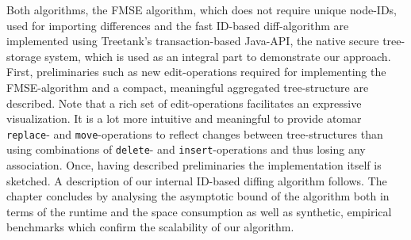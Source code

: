 
Both algorithms, the FMSE algorithm, which does not require unique node-IDs, used for importing differences and the fast ID-based diff-algorithm are implemented using Treetank's transaction-based Java-API, the native secure tree-storage system, which is used as an integral part to demonstrate our approach. First, preliminaries such as new edit-operations required for implementing the FMSE-algorithm and a compact, meaningful aggregated tree-structure are described. Note that a rich set of edit-operations facilitates an expressive visualization. It is a lot more intuitive and meaningful to provide atomar \texttt{replace}- and \texttt{move}-operations to reflect changes between tree-structures than using combinations of \texttt{delete}- and \texttt{insert}-operations and thus losing any association. Once, having described preliminaries the implementation itself is sketched. A description of our internal ID-based diffing algorithm follows. The chapter concludes by analysing the asymptotic bound of the algorithm both in terms of the runtime and the space consumption as well as synthetic, empirical benchmarks which confirm the scalability of our algorithm.


